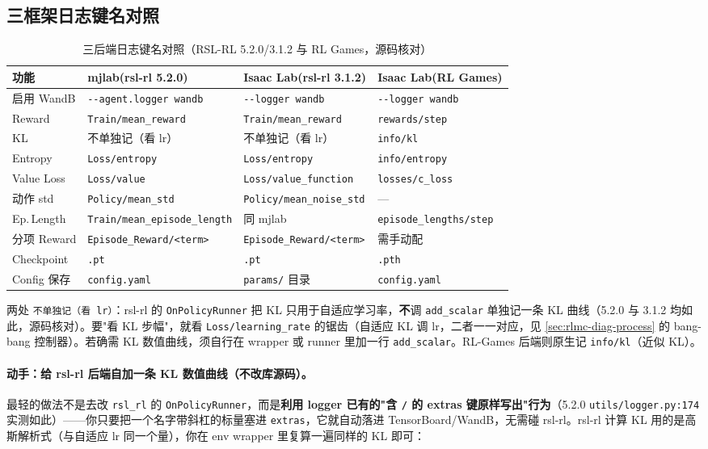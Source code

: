 \subsection{三框架日志键名对照}

\begin{table}[H]
\centering
\caption{三后端日志键名对照（RSL-RL 5.2.0/3.1.2 与 RL Games，源码核对）}
\label{tab:rlmc-diag-logmap}
\begin{tabular}{p{2.6cm}p{3.1cm}p{3.1cm}p{2.6cm}}
\hline
功能 & mjlab(rsl-rl 5.2.0) & Isaac Lab(rsl-rl 3.1.2) & Isaac Lab(RL Games) \\
\hline
启用 WandB & \verb|--agent.logger wandb| & \verb|--logger wandb| & \verb|--logger wandb| \\
Reward & \verb|Train/mean_reward| & \verb|Train/mean_reward| & \verb|rewards/step| \\
KL & 不单独记（看 lr） & 不单独记（看 lr） & \verb|info/kl| \\
Entropy & \verb|Loss/entropy| & \verb|Loss/entropy| & \verb|info/entropy| \\
Value Loss & \verb|Loss/value| & \verb|Loss/value_function| & \verb|losses/c_loss| \\
动作 std & \verb|Policy/mean_std| & \verb|Policy/mean_noise_std| & — \\
Ep.\,Length & \verb|Train/mean_episode_length| & 同 mjlab & \verb|episode_lengths/step| \\
分项 Reward & \verb|Episode_Reward/<term>| & \verb|Episode_Reward/<term>| & 需手动配 \\
Checkpoint & \verb|.pt| & \verb|.pt| & \verb|.pth| \\
Config 保存 & \verb|config.yaml| & \verb|params/| 目录 & \verb|config.yaml| \\
\hline
\end{tabular}
\end{table}

\begin{note}
两处 \verb|不单独记（看 lr）|：rsl-rl 的 \verb|OnPolicyRunner| 把 KL 只用于自适应学习率，\textbf{不}调 \verb|add_scalar| 单独记一条 KL 曲线（5.2.0 与 3.1.2 均如此，源码核对）。要"看 KL 步幅"，就看 \verb|Loss/learning_rate| 的锯齿（自适应 KL 调 lr，二者一一对应，见 \cref{sec:rlmc-diag-process} 的 bang-bang 控制器）。若确需 KL 数值曲线，须自行在 wrapper 或 runner 里加一行 \verb|add_scalar|。RL-Games 后端则原生记 \verb|info/kl|（近似 KL）。
\end{note}

\paragraph{动手：给 rsl-rl 后端自加一条 KL 数值曲线（不改库源码）。}最轻的做法不是去改 \verb|rsl_rl| 的 \verb|OnPolicyRunner|，而是\textbf{利用 logger 已有的"含 \texttt{/} 的 extras 键原样写出"行为}（5.2.0 \verb|utils/logger.py:174| 实测如此）——你只要把一个名字带斜杠的标量塞进 \verb|extras|，它就自动落进 TensorBoard/WandB，无需碰 rsl-rl。rsl-rl 计算 KL 用的是高斯解析式（与自适应 lr 同一个量），你在 env wrapper 里复算一遍同样的 KL 即可：

